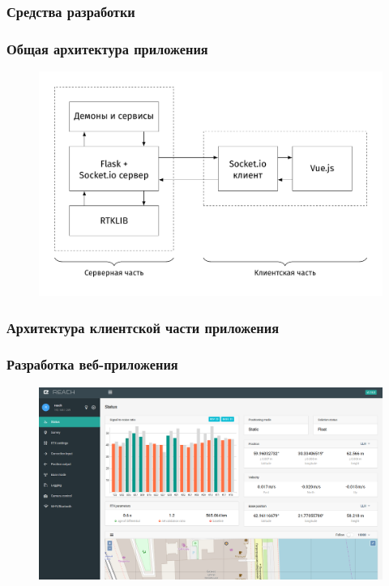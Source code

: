 \documentclass[xetex,t]{beamer}
\begin{document}
%
%
\begin{frame}
  \frametitle{Средства разработки}
\end{frame}


%
%
\begin{frame}
  \frametitle{Общая архитектура приложения}
  \vskip -0.75cm
  \begin{figure}[h]
    \centering
    \includegraphics[width=.95\textwidth]{../img/tikz/system-architecture/pic_sans_no-border}
  \end{figure}
\end{frame}


%
%
\begin{frame}
  \frametitle{Архитектура клиентской части приложения}
\end{frame}


%
%
\begin{frame}
  \frametitle{Разработка веб-приложения}
  \vskip -0.5cm
  \begin{figure}[h]
    \centering
    \includegraphics[width=.95\textwidth]{../img/reachview/home}
  \end{figure}
\end{frame}
\end{document}
